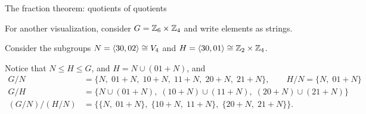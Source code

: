 \documentclass[8pt, handout]{beamer}
\newcommand{\Pause}{}      %
\begin{document}
\begin{frame}{The fraction theorem: quotients of quotients} \smallskip

  For another visualization, consider $G=\mathbb{Z}_6\times\mathbb{Z}_4$ and write
  elements as strings. \medskip\Pause
  
  Consider the subgroups $N=\langle30,02\rangle\cong V_4$ and
  $H=\langle30,01\rangle\cong\mathbb{Z}_2\times\mathbb{Z}_4$. \medskip\Pause
  
  Notice that $N\leq H\leq G$, and $H=N\cup(01\!+\!N)$, and 
  \begin{align*}
    G/N&=\big\{N,\;01\!+\!N,\;10\!+\!N,\;11\!+\!N,\;20\!+\!N,\;21\!+\!N\big\},\qquad H/N=\{N,\;01\!+\!N\} \\
    G/H&=\Big\{N\cup (01\!+\!N),\;(10\!+\!N)\cup (11\!+\!N),\;(20\!+\!N)\cup (21\!+\!N)\Big\} \\
    (G/N)/(H/N)&=\Big\{\{N,\;01\!+\!N\},\;\{10\!+\!N,\;11\!+\!N\},\;\{20\!+\!N,\;21\!+\!N\}\Big\}.
  \end{align*}


\end{frame}
\end{document}

